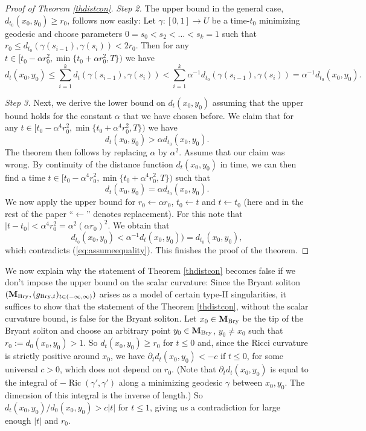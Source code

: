 \documentclass[11pt]{amsart}
\numberwithin{equation}{section}
\def\M{{\bf M}}
\DeclareMathOperator{\Ric}{Ric}
\numberwithin{equation}{section}
\begin{document}
\begin{proof}[Proof of Theorem \ref{thdistcon}]
\textit{Step 2.}
The upper bound in the general case, $d_{t_0} (x_0, y_0) \geq r_0$, follows now easily:
Let $\gamma : [0,1] \to U$ be a time-$t_0$ minimizing geodesic and choose parameters $0 = s_0 < s_2 < \ldots < s_k = 1$ such that $r_0 \leq d_{t_0} (\gamma(s_{i-1}), \gamma(s_i)) < 2 r_0$.
Then for any $t \in [t_0 - \alpha r_0^2, \min \{ t_0 + \alpha r_0^2, T \})$ we have
\[ d_t (x_0, y_0) \leq \sum_{i=1}^k d_t (\gamma(s_{i-1}), \gamma (s_i)) < \sum_{i=1}^k \alpha^{-1} d_{t_0} (\gamma(s_{i-1}), \gamma (s_i)) = \alpha^{-1} d_{t_0} (x_0, y_0). \]

\textit{Step 3.}
Next, we derive the lower bound on $d_t (x_0, y_0)$ assuming that the upper bound holds for the constant $\alpha$ that we have chosen before.
We claim that for any $t \in [t_0 - \alpha^4 r_0^2, \min \{ t_0 + \alpha^4 r_0^2, T \} )$ we have
\[ d_t (x_0, y_0) > \alpha d_{t_0} (x_0, y_0). \]
The theorem then follows by replacing $\alpha$ by $\alpha^2$.
Assume that our claim was wrong.
By continuity of the distance function $d_t (x_0, y_0)$ in time, we can then find a time $t \in [t_0 - \alpha^4 r_0^2, \min \{ t_0 + \alpha^4 r_0^2, T \} )$ such that
\begin{equation} \label{eq:assumeequality}
 d_t (x_0, y_0) = \alpha d_{t_0} (x_0, y_0).
\end{equation}
We now apply the upper bound for $r_0 \leftarrow \alpha r_0$, $t_0 \leftarrow t$ and $t \leftarrow t_0$ (here and in the rest of the paper ``$\leftarrow$'' denotes replacement).
For this note that $|t - t_0| < \alpha^4 r_0^2 = \alpha^2 (\alpha r_0)^2$.
We obtain that
\[ d_{t_0} (x_0, y_0) < \alpha^{-1} d_{t} (x_0, y_0)) = d_{t_0} (x_0, y_0), \]
which contradicts (\ref{eq:assumeequality}).
This finishes the proof of the theorem.
\end{proof}

We now explain why the statement of Theorem \ref{thdistcon} becomes false if we don't impose the upper bound on the scalar curvature:
Since the Bryant soliton $(\M_{\textnormal{Bry}}, (g_{\textnormal{Bry}, t})_{t \in (-\infty, \infty)})$ arises as a model of certain type-II singularities, it suffices to show that the statement of the Theorem \ref{thdistcon}, without the scalar curvature bound, is false for the Bryant soliton.
Let $x_0 \in \M_{\textnormal{Bry}}$ be the tip of the Bryant soliton and choose an arbitrary point $y_0 \in\M_{\textnormal{Bry}}$, $y_0 \neq x_0$ such that $r_0 := d_0 (x_0, y_0) > 1$.
So $d_t (x_0,y_0) \geq r_0$ for $t \leq 0$ and, since the Ricci curvature is strictly positive around $x_0$, we have $\partial_t d_t (x_0,y_0) < -c$ if $t \leq 0$, for some universal $c > 0$, which does not depend on $r_0$. (Note that $\partial_t d_t (x_0,y_0)$ is equal to the integral of $-\Ric (\gamma', \gamma')$ along a minimizing geodesic $\gamma$ between $x_0, y_0$. The dimension of this integral is the inverse of length.)
So $d_t (x_0,y_0) / d_0 (x_0,y_0) > c |t|$ for $t \leq 1$, giving us a contradiction for large enough $|t|$ and $r_0$.
\end{document}

